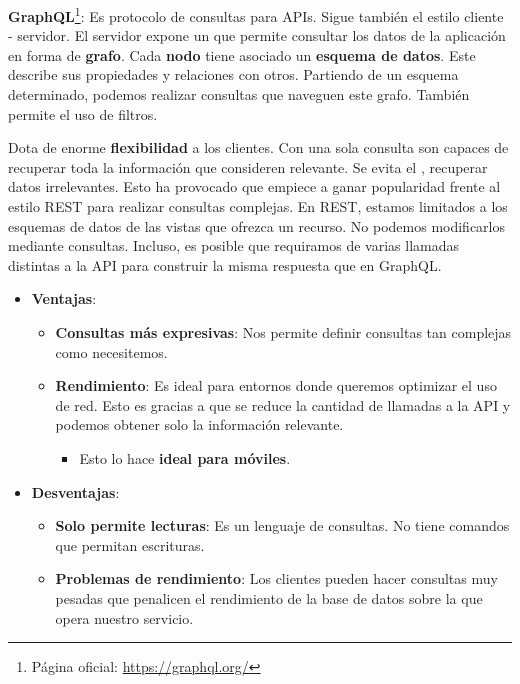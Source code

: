 \textbf{GraphQL}\footnote{Página oficial: \url{https://graphql.org/}}: Es protocolo de consultas para APIs. Sigue también el estilo cliente - servidor. El servidor expone un  que permite consultar los datos de la aplicación en forma de \textbf{grafo}. Cada \textbf{nodo} tiene asociado un \textbf{esquema de datos}. Este describe sus propiedades y relaciones con otros. Partiendo de un esquema determinado, podemos realizar consultas que naveguen este grafo. También permite el uso de filtros.

Dota de enorme \textbf{flexibilidad} a los clientes. Con una sola consulta son capaces de recuperar toda la información que consideren relevante. Se evita el \textbf{}, recuperar datos irrelevantes. \cite{porcelloLearningGraphQLDeclarative2021} Esto ha provocado que empiece a ganar popularidad frente al estilo REST para realizar consultas complejas. \cite{britoRESTVsGraphQL2020} En REST, estamos limitados a los esquemas de datos de las vistas que ofrezca un recurso. No podemos modificarlos mediante consultas. Incluso, es posible que requiramos de varias llamadas distintas a la API para construir la misma respuesta que en GraphQL.

\begin{itemize}
  \item \textbf{Ventajas}:

  \begin{itemize}
    \item \textbf{Consultas más expresivas}: Nos permite definir consultas tan complejas como necesitemos.

    \item \textbf{Rendimiento}: Es ideal para entornos donde queremos optimizar el uso de red. Esto es gracias a que se reduce la cantidad de llamadas a la API y podemos obtener solo la información relevante.

    \begin{itemize}
      \item Esto lo hace \textbf{ideal para móviles}.
    \end{itemize}

  \end{itemize}

  \item \textbf{Desventajas}:

  \begin{itemize}
    \item \textbf{Solo permite lecturas}: Es un lenguaje de consultas. No tiene comandos que permitan escrituras.

    \item \textbf{Problemas de rendimiento}: Los clientes pueden hacer consultas muy pesadas que penalicen el rendimiento de la base de datos sobre la que opera nuestro servicio.
  \end{itemize}
\end{itemize}

